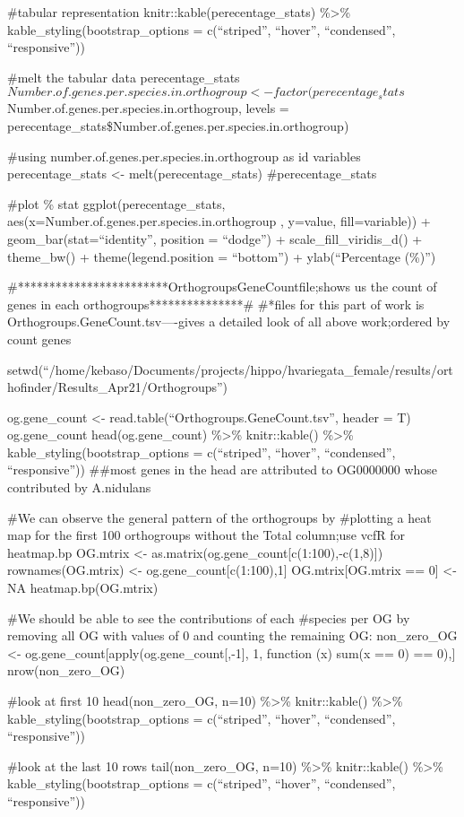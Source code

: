 \documentclass[
]{article}
\begin{document}
\#tabular representation knitr::kable(perecentage\_stats)
\%\textgreater\% kable\_styling(bootstrap\_options = c(``striped'',
``hover'', ``condensed'', ``responsive''))

\#melt the tabular data
perecentage\_stats\(Number.of.genes.per.species.in.orthogroup <- factor(perecentage_stats\)Number.of.genes.per.species.in.orthogroup,
levels = perecentage\_stats\$Number.of.genes.per.species.in.orthogroup)

\#using number.of.genes.per.species.in.orthogroup as id variables
perecentage\_stats \textless- melt(perecentage\_stats)
\#perecentage\_stats

\#plot \% stat ggplot(perecentage\_stats,
aes(x=Number.of.genes.per.species.in.orthogroup , y=value,
fill=variable)) + geom\_bar(stat=``identity'', position = ``dodge'') +
scale\_fill\_viridis\_d() + theme\_bw() + theme(legend.position =
``bottom'') + ylab(``Percentage (\%)'')

\#************************OrthogroupsGeneCountfile;shows us the count of
genes in each orthogroups***************\# \#*files for this part of
work is Orthogroups.GeneCount.tsv----gives a detailed look of all above
work;ordered by count genes

setwd(``/home/kebaso/Documents/projects/hippo/hvariegata\_female/results/orthofinder/Results\_Apr21/Orthogroups'')

og.gene\_count \textless- read.table(``Orthogroups.GeneCount.tsv'',
header = T) og.gene\_count head(og.gene\_count) \%\textgreater\%
knitr::kable() \%\textgreater\% kable\_styling(bootstrap\_options =
c(``striped'', ``hover'', ``condensed'', ``responsive'')) \#\#most genes
in the head are attributed to OG0000000 whose contributed by A.nidulans

\#We can observe the general pattern of the orthogroups by \#plotting a
heat map for the first 100 orthogroups without the Total column;use vcfR
for heatmap.bp OG.mtrix \textless-
as.matrix(og.gene\_count{[}c(1:100),-c(1,8){]}) rownames(OG.mtrix)
\textless- og.gene\_count{[}c(1:100),1{]} OG.mtrix{[}OG.mtrix == 0{]}
\textless- NA heatmap.bp(OG.mtrix)

\#We should be able to see the contributions of each \#species per OG by
removing all OG with values of 0 and counting the remaining OG:
non\_zero\_OG \textless- og.gene\_count{[}apply(og.gene\_count{[},-1{]},
1, function (x) sum(x == 0) == 0),{]} nrow(non\_zero\_OG)

\#look at first 10 head(non\_zero\_OG, n=10) \%\textgreater\%
knitr::kable() \%\textgreater\% kable\_styling(bootstrap\_options =
c(``striped'', ``hover'', ``condensed'', ``responsive''))

\#look at the last 10 rows tail(non\_zero\_OG, n=10) \%\textgreater\%
knitr::kable() \%\textgreater\% kable\_styling(bootstrap\_options =
c(``striped'', ``hover'', ``condensed'', ``responsive''))
\end{document}
